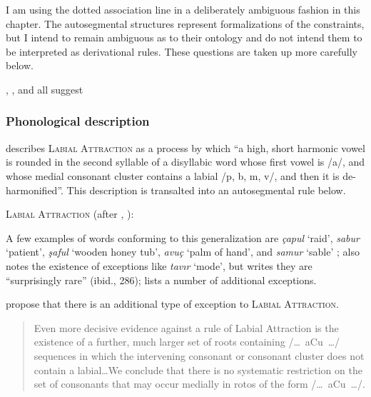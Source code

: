 
I am using the dotted association line in a deliberately ambiguous fashion in this chapter. The autosegmental structures represent formalizations of the constraints, but I intend to remain ambiguous as to their ontology and do not intend them to be interpreted as derivational rules. These questions are taken up more carefully below.

\citet{Clements1982}

\citet{Zimmer1969}, \citet{Zuraw2000}, and \citet{Inkelas2001} all suggest

\subsubsection{Phonological description}

\citet[][36]{Lees1966a} describes \textsc{Labial Attraction} as a process by which ``a high, short harmonic vowel is rounded in the second syllable of a disyllabic word whose first vowel is /a/, and whose medial consonant cluster contains a labial /p, b, m, v/, and then it is de-harmonified''. This description is transalted into an autosegmental rule below.

\ex \textsc{Labial Attraction} (after \citealt[][286]{Lees1966b}, \citealt[][171]{Inkelas2001}): \\
\xe

\noindent
A few examples of words conforming to this generalization are \emph{çapul} `raid', \emph{sabur} `patient', \emph{şaful} `wooden honey tub', \emph{avuç} `palm of hand', and \emph{samur} `sable' \citep[][285]{Lees1966b}; \citeauthor{Lees1966b} also notes the existence of exceptions like \emph{tavır} `mode', but writes they are ``surprisingly rare'' (ibid., 286); \citet[][225]{Clements1982} lists a number of additional exceptions.

\citeauthor{Clements1982} propose that there is an additional type of exception to \textsc{Labial Attraction}.

\begin{quotation}
Even more decisive evidence against a rule of Labial Attraction is the existence of a further, much larger set of roots containing /\ldots~aCu~\ldots/ sequences in which the intervening consonant or consonant cluster does not contain a labial\ldots We conclude that there is no systematic restriction on the set of consonants that may occur medially in rotos of the form /\ldots~aCu~\ldots/. \citep[][225]{Clements1982}
\end{quotation}

